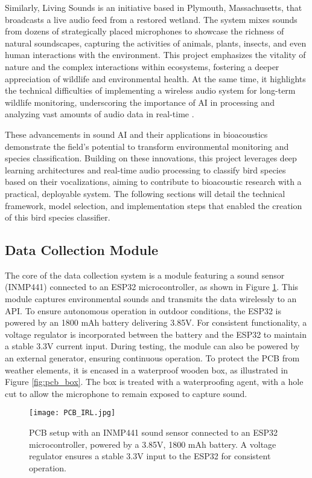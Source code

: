 Similarly, Living Sounds is an initiative based in Plymouth, Massachusetts, that broadcasts a live audio feed from a restored wetland. The system mixes sounds from dozens of strategically placed microphones to showcase the richness of natural soundscapes, capturing the activities of animals, plants, insects, and even human interactions with the environment. This project emphasizes the vitality of nature and the complex interactions within ecosystems, fostering a deeper appreciation of wildlife and environmental health. At the same time, it highlights the technical difficulties of implementing a wireless audio system for long-term wildlife monitoring, underscoring the importance of AI in processing and analyzing vast amounts of audio data in real-time \cite{mayton2020sensor}.

These advancements in sound AI and their applications in bioacoustics demonstrate the field’s potential to transform environmental monitoring and species classification. Building on these innovations, this project leverages deep learning architectures and real-time audio processing to classify bird species based on their vocalizations, aiming to contribute to bioacoustic research with a practical, deployable system. The following sections will detail the technical framework, model selection, and implementation steps that enabled the creation of this bird species classifier.

\subsection{Data Collection Module}
The core of the data collection system is a module featuring a sound sensor (INMP441) connected to an ESP32 microcontroller, as shown in Figure \ref{fig:pcb_image}. This module captures environmental sounds and transmits the data wirelessly to an API. To ensure autonomous operation in outdoor conditions, the ESP32 is powered by an 1800 mAh battery delivering 3.85V. For consistent functionality, a voltage regulator is incorporated between the battery and the ESP32 to maintain a stable 3.3V current input. During testing, the module can also be powered by an external generator, ensuring continuous operation. To protect the PCB from weather elements, it is encased in a waterproof wooden box, as illustrated in Figure \ref{fig:pcb_box}. The box is treated with a waterproofing agent, with a hole cut to allow the microphone to remain exposed to capture sound.
\begin{figure}[h]
    \centering
    \texttt{[image: PCB\_IRL.jpg]}
    \caption{PCB setup with an INMP441 sound sensor connected to an ESP32 microcontroller, powered by a 3.85V, 1800 mAh battery. A voltage regulator ensures a stable 3.3V input to the ESP32 for consistent operation.}
    \vspace{0.1cm}
    \label{fig:pcb_image}
\end{figure}

